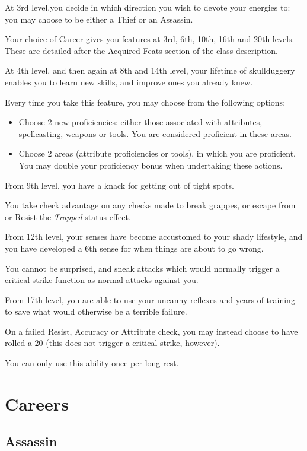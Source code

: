 {
At 3rd level,you decide in which direction you wish to devote your energies to: you may choose to be either a Thief or an Assassin. 

Your choice of Career gives you features at 3rd, 6th, 10th, 16th and 20th levels. These are detailed after the Acquired Feats section of the class description. 
}
{
At 4th level, and then again at 8th and 14th level, your lifetime of skullduggery enables you to learn new skills, and improve ones you already knew. 

Every time you take this feature, you may choose from the following options:
\begin{itemize}
	\item Choose 2 new proficiencies: either those associated with attributes, spellcasting, weapons or tools. You are considered proficient in these areas. 
	\item Choose 2 areas (attribute proficiencies or tools), in which you are proficient. You may double your proficiency bonus when undertaking these actions. 
\end{itemize}
}
{
From 9th level, you have a knack for getting out of tight spots. 

You take check advantage on any checks made to break grappes, or escape from or Resist the {\it Trapped} status effect. 
}
{
From 12th level, your senses have become accustomed to your shady lifestyle, and you have developed a 6th sense for when things are about to go wrong. 

You cannot be surprised, and sneak attacks which would normally trigger a critical strike function as normal attacks against you. 
}
{
From 17th level, you are able to use your uncanny reflexes and years of training to save what would otherwise be a terrible failure. 

On a failed Resist, Accuracy or Attribute check, you may instead choose to have rolled a 20 (this does not trigger a critical strike, however). 

You can only use this ability once per long rest. 
}
\section*{Careers}
\subsection*{\bf Assassin}


